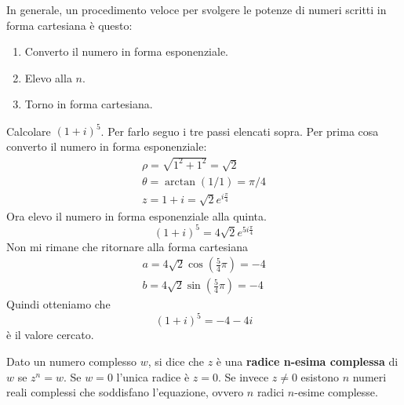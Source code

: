 In generale, un procedimento veloce per svolgere le potenze di numeri scritti in forma
cartesiana \`e questo:
\begin{enumerate}
	\item Converto il numero in forma esponenziale.
	\item Elevo alla $n$.
	\item Torno in forma cartesiana.
\end{enumerate}

\begin{example}
	Calcolare $(1 + i)^5$.
	Per farlo seguo i tre passi elencati sopra. Per prima cosa converto il numero in forma
	esponenziale:
	\begin{gather*}
		\rho = \sqrt{1^2 + 1^2} = \sqrt{2}  \\
		\theta = \arctan{(1 / 1)} = \pi / 4 \\
		z = 1 + i = \sqrt{2} e^{i \frac{\pi}{4}}
	\end{gather*}
	Ora elevo il numero in forma esponenziale alla quinta.
	\begin{equation*}
		(1 + i)^5 = 4 \sqrt{2} e^{5 i \frac{\pi}{4}}
	\end{equation*}
	Non mi rimane che ritornare alla forma cartesiana
	\begin{gather*}
		a = 4 \sqrt{2} \cos{\left( \frac{5}{4} \pi \right)} = -4 \\
		b = 4 \sqrt{2} \sin{\left( \frac{5}{4} \pi \right)} = -4
	\end{gather*}
	Quindi otteniamo che
	\begin{equation*}
		(1 + i)^5 = -4 - 4i
	\end{equation*}
	\`e il valore cercato.
\end{example}

\begin{defn}
	Dato un numero complesso $w$, si dice che $z$ \`e una \textbf{radice n-esima complessa} di $w$
	se $z^n = w$.
	Se $w = 0$ l'unica radice \`e $z = 0$. Se invece $z \neq 0$ esistono $n$ numeri reali complessi
	che soddisfano l'equazione, ovvero $n$ radici $n$-esime complesse.
\end{defn}

